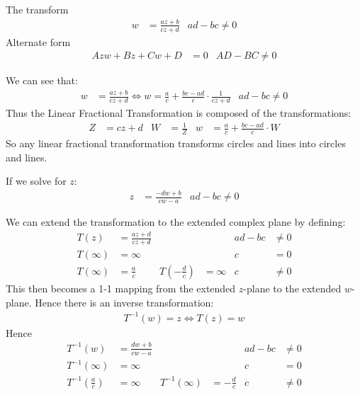 \documentclass[12pt, english]{book}
\begin{document}
	\begin{definition}
		\label{Linear Fractional Transform Definition - Complex}
		The transform
		\begin{align*}
			w &= \frac{az + b}{cz + d}	&	ad - bc \neq 0
		\end{align*}
		Alternate form
		\begin{align*}
			Azw + Bz + Cw + D &= 0	&	AD - BC \neq 0
		\end{align*}
	\end{definition}
	We can see that:
	\begin{align*}
		w &= \frac{az + b}{cz + d} \iff w = \frac{a}{c} + \frac{bc - ad}{c} \cdot \frac{1}{cz + d}
			& ad - bc \neq 0
	\end{align*}
	Thus the Linear Fractional Transformation is composed of the transformations:
	\begin{align*}
		Z &= cz + d & 
		W &= \frac{1}{Z} & 
		w &= \frac{a}{c} + \frac{bc - ad}{c} \cdot W
	\end{align*}
	So any linear fractional transformation transforms circles and lines into circles and lines. 

	If we solve for \(z\):
	\begin{align*}
		z &= \frac{-dw + b}{cw - a} &
		ad - bc \neq 0
	\end{align*}
	
	We can extend the transformation to the extended complex plane by defining:
	\begin{align*}
		T(z) &= \frac{az + d}{cz + d} & & & ad - bc &\neq 0 \\
		T(\infty) &= \infty & & & c &= 0\\
		T(\infty) &= \frac{a}{c} & T \left(-\frac{d}{c}\right) &= \infty & c &\neq 0
	\end{align*}
	This then becomes a 1-1 mapping from the extended \(z\)-plane to the extended \(w\)-plane. Hence there is an inverse transformation:
	\begin{align*}
		T^{-1}(w) = z \iff T(z) = w
	\end{align*}
	Hence 
	\begin{align*}
		T^{-1}(w) &= \frac{dw + b}{cw - a} & & & ad - bc &\neq 0 \\
		T^{-1}(\infty) &= \infty & & & c &= 0\\
		T^{-1}\left(\frac{a}{c}\right) &= \infty & T^{-1} \left(\infty\right) &= - \frac{d}{c} & c &\neq 0
	\end{align*}
\end{document}
